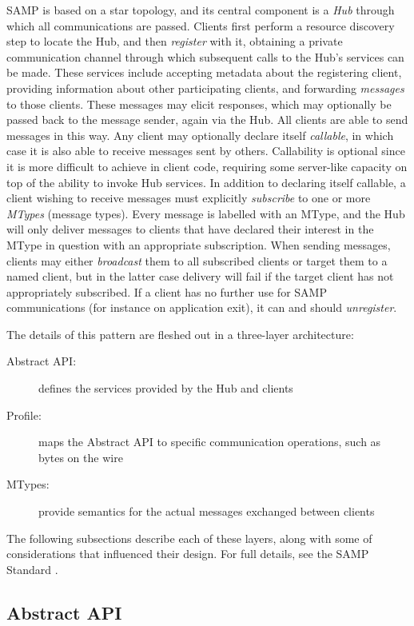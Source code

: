 \documentclass[5p]{elsarticle}
\begin{document}
SAMP is based on a star topology, and its central component is a
{\em Hub\/} through which all communications are passed.
Clients first perform a resource discovery step to locate the Hub,
and then {\em register\/} with it, obtaining a private communication
channel through which subsequent calls to the Hub's services can be made.
These services include accepting metadata about the registering client,
providing information about other participating clients,
and forwarding {\em messages\/} to those clients.
These messages may elicit responses, which may optionally be passed
back to the message sender, again via the Hub.
All clients are able to send messages in this way.
Any client may optionally declare itself {\em callable\/},
in which case it is also able to receive messages sent by others.
Callability is optional since it is more difficult to
achieve in client code, requiring some server-like capacity
on top of the ability to invoke Hub services.
In addition to declaring itself callable, a client wishing to
receive messages must explicitly {\em subscribe\/} to one or
more {\em MTypes} (message types).  Every message is labelled
with an MType, and the Hub will only deliver messages to clients
that have declared their interest in the MType in question with
an appropriate subscription.  When sending messages, clients may
either {\em broadcast\/} them to all subscribed clients or
target them to a named client, but in the latter case delivery
will fail if the target client has not appropriately subscribed.
If a client has no further use for SAMP communications
(for instance on application exit), it can and should {\em unregister\/}.

The details of this pattern are fleshed out in a three-layer architecture:
\begin{description}
\item[Abstract API:] defines the services provided by the Hub and clients
\item[Profile:] maps the Abstract API to specific communication operations,
  such as bytes on the wire
\item[MTypes:] provide semantics for the actual messages exchanged between
  clients
\end{description}
The following subsections describe each of these layers,
along with some of considerations that influenced their design.
For full details, see the SAMP Standard \citep{samp_std}.

\subsection{Abstract API}
\end{document}
